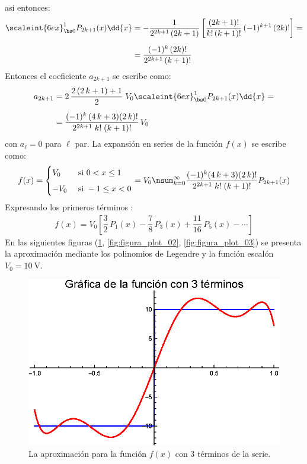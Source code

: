así entonces:
\begin{align}
\begin{aligned}[b]
\scaleint{6ex}_{\bs 0}^{1} P_{2k+1} (x) \dd{x} &= - \dfrac{1}{2^{2k+1} \, (2k + 1)} \, \bigg[ \dfrac{(2k + 1)!}{k! \, (k + 1)!} \, (-1)^{k+1} \, (2k)! \bigg] = \\[0.5em]
&= \dfrac{(-1)^{k} \, (2k)!}{2^{2k+1} \, (k+1)!}
\end{aligned}
\label{eq:ecuacion_26_49}
\end{align}
Entonces el coeficiente $a_{2k+1}$ se escribe como:
\begin{align*}
a_{2k+1} &= 2 \, \dfrac{2 \, (2 \, k + 1) + 1}{2} \; V_{0} \scaleint{6ex}_{\bs 0}^{1} P_{2k+1} (x) \dd{x} = \\[0.5em]
&= \dfrac{(-1)^{k} \, (4 \, k + 3)(2 \, k)!}{2^{2k+1} \; k! \; (k+1)!} \, V_{0}
\end{align*}
con $a_{\ell} = 0$ para $\ell$ par. La expansión en series de la función $f (x)$ se escribe como:
\begin{align*}
f(x) = \begin{cases}
V_{0} & \mbox{ si } 0 < x \leq 1 \\[0.5em]
-V_{0} & \mbox{ si } -1 \leq x < 0
\end{cases}
= V_{0} \nsum_{k=0}^{\infty} \dfrac{(-1)^{k}(4 \, k + 3)(2 \, k)!}{2^{2k+1} \; k! \; (k+1)!} P_{2k+1} (x)
\end{align*}
Expresando los primeros términos :
\begin{align*}
f (x) = V_{0} \left[ \dfrac{3}{2} \, P_{1}(x) - \dfrac{7}{8} \, P_{3}(x) + \dfrac{11}{16} \, P_{5}(x) - \cdots \right]
\end{align*}
En las siguientes figuras (\ref{fig:figura_plot_01}, \ref{fig:figura_plot_02}, \ref{fig:figura_plot_03}) se presenta la aproximación mediante los polinomios de Legendre y la función escalón $V_{0} = \SI{10}{\volt}$.
\begin{figure}[H]
    \centering
    \includegraphics[scale=1]{Imagenes/Expansion_Legendre_V_03.eps}
    \caption{La aproximación para la función $f (x)$ con 3 términos de la serie.}
    \label{fig:figura_plot_01}
\end{figure}
